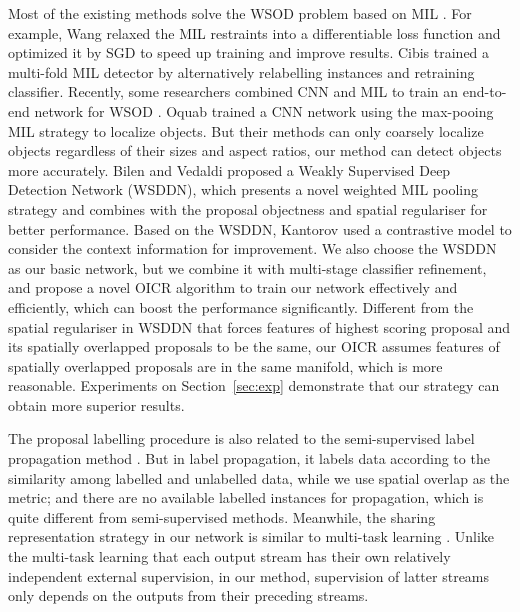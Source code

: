 \documentclass[10pt,twocolumn,letterpaper]{article}
\begin{document}
Most of the existing methods solve the WSOD problem based on MIL \cite{Ref:Bilen2015,Ref:Bilen2016,Ref:Cibis2017,Ref:Kantorov2016,Ref:Oquab2015,Ref:Song2014,Ref:Wang2015}.
For example, Wang \etal \cite{Ref:Wang2015} relaxed the MIL restraints into a differentiable loss function and optimized it by SGD to speed up training and improve results.
Cibis \etal \cite{Ref:Cibis2017} trained a multi-fold MIL detector by alternatively relabelling instances and retraining classifier.
Recently, some researchers combined CNN and MIL to train an end-to-end network for WSOD \cite{Ref:Bilen2016,Ref:Kantorov2016,Ref:Oquab2015}.
Oquab \etal \cite{Ref:Oquab2015} trained a CNN network using the max-pooing MIL strategy to localize objects.
But their methods can only coarsely localize objects regardless of their sizes and aspect ratios, our method can detect objects more accurately.
Bilen and Vedaldi \cite{Ref:Bilen2016} proposed a Weakly Supervised Deep Detection Network (WSDDN), which presents a novel weighted MIL pooling strategy and combines with the proposal objectness and spatial regulariser for better performance.
Based on the WSDDN, Kantorov \etal \cite{Ref:Kantorov2016} used a contrastive model to consider the context information for improvement.
We also choose the WSDDN as our basic network, but we combine it with multi-stage classifier refinement, and propose a novel OICR algorithm to train our network effectively and efficiently, which can boost the performance significantly.
Different from the spatial regulariser in WSDDN \cite{Ref:Bilen2016} that forces features of highest scoring proposal and its spatially overlapped proposals to be the same, our OICR assumes features of spatially overlapped proposals are in the same manifold, which is more reasonable.
Experiments on Section~\ref{sec:exp} demonstrate that our strategy can obtain more superior results.

The proposal labelling procedure is also related to the semi-supervised label propagation method \cite{Ref:Bai2017,Ref:Zhu2002}.
But in label propagation, it labels data according to the similarity among labelled and unlabelled data, while we use spatial overlap as the metric; and there are no available labelled instances for propagation, which is quite different from semi-supervised methods.
Meanwhile, the sharing representation strategy in our network is similar to multi-task learning \cite{Ref:Caruana1997}.
Unlike the multi-task learning that each output stream has their own relatively independent external supervision, in our method, supervision of latter streams only depends on the outputs from their preceding streams.
\end{document}
